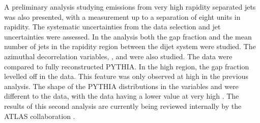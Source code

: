 A preliminary analysis studying  emissions from very high rapidity separated jets was also presented, with a measurement up to a separation of eight units in rapidity.
The systematic uncertainties from the data selection and jet uncertainties were assessed.
In the analysis both the gap fraction and the mean number of jets in the rapidity region between the dijet system were studied. 
The azimuthal decorrelation variables, \dphiDist{}, \mean{\cosdphi} and \mean{\costwodphi} were also studied.
The data were compared to fully reconstructed PYTHIA.
In the high \dy{} region, the gap fraction levelled off in the data. 
This feature was only observed at high \pt{} in the previous analysis. 
The shape of the PYTHIA distributions in the variables \mean{\cosdphi} and \mean{\costwodphi} were different to the data, with the data having a lower value at very high \dy{}.  
The results of this second analysis are currently being reviewed internally by the ATLAS collaboration \cite{ref:GBJInternal}.



